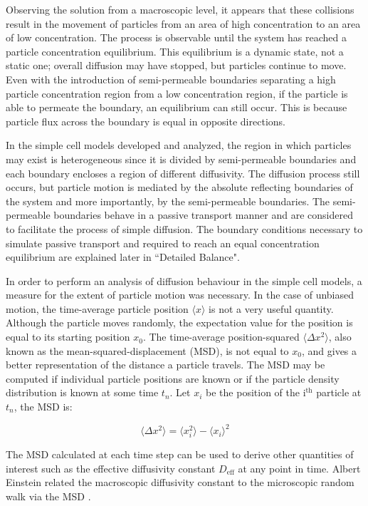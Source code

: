 	\newpage
	Observing the solution from a macroscopic level, it appears that these collisions result in the movement of particles from an area of high concentration to an area of low concentration. The process is observable until the system has reached a particle concentration equilibrium. This equilibrium is a dynamic state, not a static one; overall diffusion may have stopped, but particles continue to move. Even with the introduction of semi-permeable boundaries separating a high particle concentration region from a low concentration region, if the particle is able to permeate the boundary, an equilibrium can still occur. This is because particle flux across the boundary is equal in opposite directions.
	
	In the simple cell models developed and analyzed, the region in which particles may exist is heterogeneous since it is divided by semi-permeable boundaries and each boundary encloses a region of different diffusivity. The diffusion process still occurs, but particle motion is mediated by the absolute reflecting boundaries of the system and more importantly, by the semi-permeable boundaries. The semi-permeable boundaries behave in a passive transport manner and are considered to facilitate the process of simple diffusion. The boundary conditions necessary to simulate passive transport and required to reach an equal concentration equilibrium are explained later in ``Detailed Balance".
	
	In order to perform an analysis of diffusion behaviour in the simple cell models, a measure for the extent of particle motion was necessary. In the case of unbiased motion, the time-average particle position $ \langle x \rangle $ is not a very useful quantity. Although the particle moves randomly, the expectation value for the position is equal to its starting position $ x_0 $. The time-average position-squared $ \langle \Delta x^2 \rangle $, also known as the mean-squared-displacement (MSD), is not equal to $ x_0 $, and gives a better representation of the distance a particle travels. The MSD may be computed if individual particle positions are known or if the particle density distribution is known at some time $ t_n $. Let $ x_i $ be the position of the $ \textrm{i}^\textrm{th} $ particle at $ t_n $, the MSD is:
		
	\begin{equation}
		\langle \Delta x^2 \rangle = \langle x_{i}^2 \rangle - \langle x_i \rangle^2
	\end{equation}
	
	The MSD calculated at each time step can be used to derive other quantities of interest such as the effective diffusivity constant $ D_\textrm{eff} $ at any point in time. Albert Einstein related the macroscopic diffusivity constant to the microscopic random walk via the MSD \citep{diffusion-1}.
	
